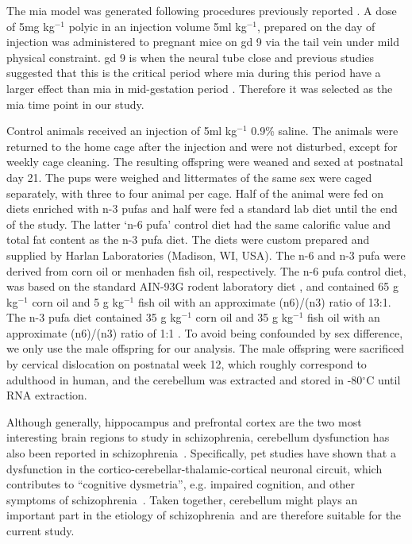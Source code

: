 \documentclass[12pt]{scrbook}
\newcommand*{\scz}{schizophrenia}
\begin{document}
The \gls{mia} model was generated following procedures previously reported \citep{Li2009c}. 
A dose of 5mg kg$^{-1}$ \gls{polyic} in an injection volume 5ml kg$^{-1}$, prepared on the day of injection was administered to pregnant mice on \gls{gd} 9 via the tail vein under mild physical constraint. 
\gls{gd} 9 is when the neural tube close and previous studies suggested that this is the critical period where \gls{mia} during this period have a larger effect than \gls{mia} in mid-gestation period \citep{Meyer2007a,Li2010a}.
Therefore it was selected as the \gls{mia} time point in our study.

Control animals received an injection of 5ml kg$^{-1}$ 0.9\% saline. 
The animals were returned to the home cage after the injection and were not disturbed, except for weekly cage cleaning.
The resulting offspring were weaned and sexed at postnatal day 21. 
The pups were weighed and littermates of the same sex were caged separately, with three to four animal per cage.
Half of the animal were fed on diets enriched with n-3 \glspl{pufa} and half were fed a standard  lab diet until the end of the study.
The latter `n-6 \gls{pufa}' control diet had the same calorific value and total fat content as the n-3 \gls{pufa} diet. 
The diets were custom prepared and supplied by Harlan Laboratories (Madison, WI, USA). 
The n-6 and n-3 \gls{pufa} were derived from corn oil or menhaden fish oil, respectively. 
The n-6 \gls{pufa} control diet, was based on the standard AIN-93G rodent laboratory diet \citep{Reeves1993}, and contained 65 g kg$^{-1}$ corn oil and 5 g kg$^{-1}$ fish oil with an approximate (n6)/(n3) ratio of 13:1. 
The n-3 \gls{pufa} diet contained 35 g kg$^{-1}$ corn oil and 35 g kg$^{-1}$ fish oil with an approximate (n6)/(n3) ratio of 1:1 \citep{Olivo2005}.
To avoid being confounded by sex difference, we only use the male offspring for our analysis.
The male offspring were sacrificed by cervical dislocation on postnatal week 12, which roughly correspond to adulthood in human, and the cerebellum was extracted and stored in -80$^{\circ}$C until RNA extraction.

Although generally, hippocampus \citep{Velakoulis2006,Nugent2007} and prefrontal cortex \citep{Knable1997,Perlstein2001} are the two most interesting brain regions to study in \scz, cerebellum dysfunction has also been reported in \scz\ \citep{Yeganeh-Doost2011,Andreasen2008}.
Specifically, \gls{pet} studies have shown that a dysfunction in the cortico-cerebellar-thalamic-cortical neuronal circuit, which contributes to ``cognitive dysmetria'', e.g. impaired cognition, and other symptoms of \scz\ \citep{Yeganeh-Doost2011}.
Taken together, cerebellum might plays an important part in the etiology of \scz\ and are therefore suitable for the current study. 
\end{document}

